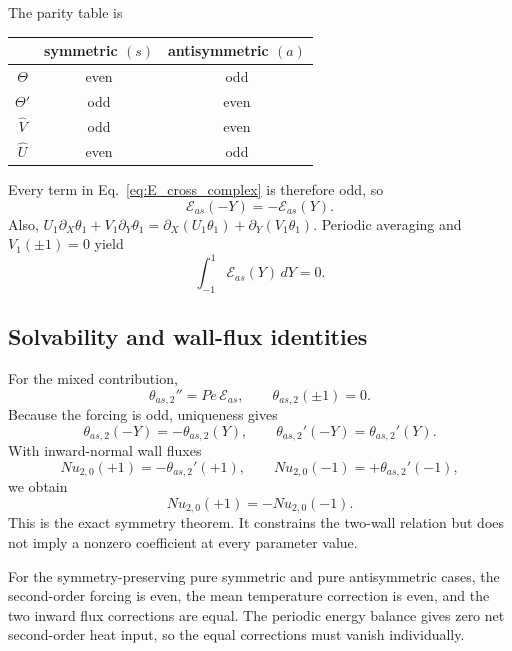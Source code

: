 \documentclass[12pt,a4paper]{article}
\newcommand{\Pe}{\mathit{Pe}}
\newcommand{\Nu}{\mathit{Nu}}
\begin{document}
The parity table is
\begin{center}
\begin{tabular}{c|cc}
 & symmetric $(s)$ & antisymmetric $(a)$ \\
\hline
$\Theta$ & even & odd \\
$\Theta'$ & odd & even \\
$\widehat V$ & odd & even \\
$\widehat U$ & even & odd
\end{tabular}
\end{center}
Every term in Eq.~\eqref{eq:E_cross_complex} is therefore odd, so
\begin{equation}
  \mathcal E_{as}(-Y)=-\mathcal E_{as}(Y).
  \label{eq:Eas_odd}
\end{equation}
Also,
$U_1\partial_X\theta_1+V_1\partial_Y\theta_1=\partial_X(U_1\theta_1)+\partial_Y(V_1\theta_1)$.
Periodic averaging and $V_1(\pm1)=0$ yield
\begin{equation}
  \int_{-1}^{1}\mathcal E_{as}(Y)\,dY=0.
  \label{eq:Eas_integral}
\end{equation}

\subsection{Solvability and wall-flux identities}

For the mixed contribution,
\begin{equation}
  \theta_{as,2}''=\Pe\,\mathcal E_{as},\qquad \theta_{as,2}(\pm1)=0.
  \label{eq:theta_as_BVP}
\end{equation}
Because the forcing is odd, uniqueness gives
\begin{equation}
  \theta_{as,2}(-Y)=-\theta_{as,2}(Y),\qquad
  \theta_{as,2}'(-Y)=\theta_{as,2}'(Y).
\end{equation}
With inward-normal wall fluxes
\begin{equation}
  \Nu_{2,0}(+1)=-\theta_{as,2}'(+1),\qquad
  \Nu_{2,0}(-1)=+\theta_{as,2}'(-1),
  \label{eq:Nu_walls}
\end{equation}
we obtain
\begin{equation}
  \boxed{\Nu_{2,0}(+1)=-\Nu_{2,0}(-1)}.
  \label{eq:Nu_antisym}
\end{equation}
This is the exact symmetry theorem. It constrains the two-wall relation but does not imply a nonzero
coefficient at every parameter value.

For the symmetry-preserving pure symmetric and pure antisymmetric cases, the second-order forcing is even,
the mean temperature correction is even, and the two inward flux corrections are equal. The periodic
energy balance gives zero net second-order heat input, so the equal corrections must vanish individually.
\end{document}
